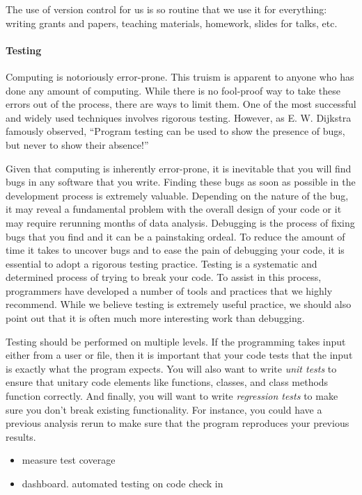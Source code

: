 \documentclass[ChapterTOCs,krantz2]{krantz} %
\begin{document}
The use of version control for us is so routine that we use it for everything:
writing grants and papers, teaching materials, homework, slides for talks, etc.

\paragraph{ {\bf Testing}} Computing is notoriously error-prone. This truism is
apparent to anyone who has done any amount of computing. While there is no
fool-proof way to take these errors out of the process, there are ways to limit
them. One of the most successful and widely used techniques involves rigorous
testing.  However, as E. W. Dijkstra famously observed, ``Program testing can
be used to show the presence of bugs, but never to show their absence!''
\cite{dahl1972structured}

Given that computing is inherently error-prone, it is inevitable that you will
find bugs in any software that you write. Finding these bugs as soon as
possible in the development process is extremely valuable. Depending on the
nature of the bug, it may reveal a fundamental problem with the overall design
of your code or it may require rerunning months of data analysis. Debugging is
the process of fixing bugs that you find and it can be a painstaking ordeal. To
reduce the amount of time it takes to uncover bugs and to ease the pain of
debugging your code, it is essential to adopt a rigorous testing practice.
Testing is a systematic and determined process of trying to break your code.
To assist in this process, programmers have developed a number of tools and
practices that we highly recommend. While we believe testing is extremely
useful practice, we should also point out that it is often much more
interesting work than debugging.

Testing should be performed on multiple levels. If the programming takes input
either from a user or file, then it is important that your code tests that the
input is exactly what the program expects. You will also want to write \emph{unit
tests} to ensure that unitary code elements like functions, classes, and
class methods function correctly. And finally, you will want to write
\emph{regression tests} to make sure you don't break existing functionality.
For instance, you could have a previous analysis rerun to make sure that
the program reproduces your previous results.


\begin{itemize}
\item measure test coverage
\item dashboard. automated testing on code check in
\end{itemize}
\end{document}
